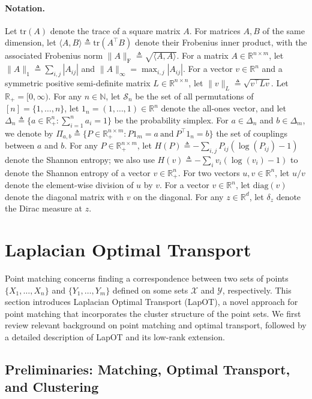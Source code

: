 \documentclass{article}
\theoremstyle{definition}
\newcommand{\cS}{\mathcal{S}}
\newcommand{\cX}{\mathcal{X}}
\newcommand{\cY}{\mathcal{Y}}
\newcommand{\N}{\mathbb{N}}
\newcommand{\R}{\mathbb{R}}
\begin{document}
\paragraph{Notation.}
Let $\mathrm{tr}(A)$ denote the trace of a square matrix $A$. For matrices $A, B$ of the same dimension, let $\langle A, B \rangle \triangleq \mathrm{tr}(A^\top B)$ denote their Frobenius inner product, with the associated Frobenius norm $\|A\|_{\mathrm{F}} \triangleq \sqrt{\langle A, A \rangle}$. For a matrix $A \in \R^{n \times m}$, let $\|A\|_1 \triangleq \sum_{i, j} |A_{i j}|$ and $\|A\|_\infty = \max_{i,j} |A_{i j}|$. For a vector $v \in \R^n$ and a symmetric positive semi-definite matrix $L \in \R^{n \times n}$, let $\|v\|_{L} \triangleq \sqrt{v^\top L v}$. Let $\R_+ = [0,\infty)$. For any $n \in \N$, let $\cS_n$ be the set of all permutations of $[n] = \{1, \ldots, n\}$, let $1_n = (1, \ldots, 1) \in \R^n$ denote the all-ones vector, and let $\Delta_n \triangleq \{a \in \R_+^n : \sum_{i = 1}^n a_i = 1\}$ be the probability simplex. For $a \in \Delta_n$ and $b \in \Delta_m$, we denote by $\Pi_{a, b} \triangleq \{P \in \R_+^{n \times m} : P 1_m = a ~ \text{and} ~ P^\top 1_n = b\}$ the set of couplings between $a$ and $b$. For any $P \in \R_+^{n \times m}$, let $H(P) \triangleq - \sum_{i, j} P_{i j} (\log(P_{i j}) - 1)$ denote the Shannon entropy; we also use $H(v) \triangleq - \sum_{i} v_i (\log(v_i) - 1)$ to denote the Shannon entropy of a vector $v \in \R_+^n$. For two vectors $u, v \in \R^n$, let $u / v$ denote the element-wise division of $u$ by $v$. For a vector $v \in \R^n$, let $\mathrm{diag}(v)$ denote the diagonal matrix with $v$ on the diagonal. For any $z \in \R^d$, let $\delta_z$ denote the Dirac measure at $z$.

\section{Laplacian Optimal Transport}
\label{sec:lapot}
Point matching concerns finding a correspondence between two sets of points $\{X_1, \ldots, X_n\}$ and $\{Y_1, \ldots, Y_m\}$ defined on some sets $\cX$ and $\cY$, respectively. This section introduces Laplacian Optimal Transport (LapOT), a novel approach for point matching that incorporates the cluster structure of the point sets. We first review relevant background on point matching and optimal transport, followed by a detailed description of LapOT and its low-rank extension. 

\subsection{Preliminaries: Matching, Optimal Transport, and Clustering}
\label{sec:preliminaries}
\end{document}
